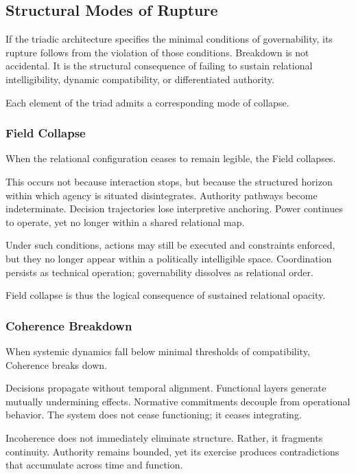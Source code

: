 \documentclass[12pt]{article}
\begin{document}
\subsection{Structural Modes of Rupture}


If the triadic architecture specifies the minimal conditions of governability, its rupture follows from the violation of those conditions. Breakdown is not accidental. It is the structural consequence of failing to sustain relational intelligibility, dynamic compatibility, or differentiated authority.

Each element of the triad admits a corresponding mode of collapse.

\subsubsection{Field Collapse}


When the relational configuration ceases to remain legible, the Field collapses.

This occurs not because interaction stops, but because the structured horizon within which agency is situated disintegrates. Authority pathways become indeterminate. Decision trajectories lose interpretive anchoring. Power continues to operate, yet no longer within a shared relational map.

Under such conditions, actions may still be executed and constraints enforced, but they no longer appear within a politically intelligible space. Coordination persists as technical operation; governability dissolves as relational order.

Field collapse is thus the logical consequence of sustained relational opacity.

\subsubsection{Coherence Breakdown}


When systemic dynamics fall below minimal thresholds of compatibility, Coherence breaks down.

Decisions propagate without temporal alignment. Functional layers generate mutually undermining effects. Normative commitments decouple from operational behavior. The system does not cease functioning; it ceases integrating.

Incoherence does not immediately eliminate structure. Rather, it fragments continuity. Authority remains bounded, yet its exercise produces contradictions that accumulate across time and function.
\end{document}
